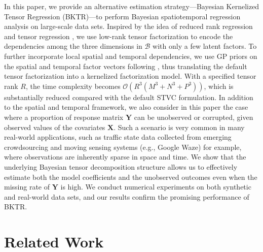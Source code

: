 \documentclass[12pt]{article}
\newcommand{\bd}[1]{\boldsymbol{#1}}
\begin{document}
In this paper, we provide an alternative estimation strategy---Bayesian Kernelized Tensor Regression (BKTR)---to perform Bayesian spatiotemporal regression analysis on large-scale data sets. Inspired by the idea of reduced rank regression and tensor regression \cite[e.g.,][]{izenman1975reduced,zhou2013tensor,bahadori2014fast,guhaniyogi2017bayesian}, we use low-rank tensor factorization to encode the dependencies among the three dimensions in $\bd{\mathcal{B}}$ with only a few latent factors. To further incorporate local spatial and temporal dependencies, we use GP priors on the spatial and temporal factor vectors following \citet{luttinen2009variational}, thus translating the default tensor factorization into a kernelized factorization model. With a specified tensor rank $R$, the time complexity becomes $\mathcal{O}\left(R^3\left(M^3+N^3+P^3\right)\right)$, which is substantially reduced compared with the default STVC formulation. In addition to the spatial and temporal framework, we also consider in this paper the case where a  proportion of response matrix $\boldsymbol{Y}$ can be unobserved or corrupted, given observed values of the covariates $\boldsymbol{X}$. Such a scenario is very common in many real-world applications, such as traffic state data collected from emerging crowdsourcing and moving sensing systems (e.g., Google Waze) for example, where observations are inherently sparse in space and time. %
We show that the underlying Bayesian tensor decomposition structure allows us to effectively estimate both the model coefficients and the unobserved outcomes even when the missing rate of $\boldsymbol{Y}$ is high. We conduct numerical experiments on both synthetic and real-world data sets, and our results confirm the promising performance of BKTR.





\section{Related Work}
\label{sec:RelatedWork}


\end{document}
